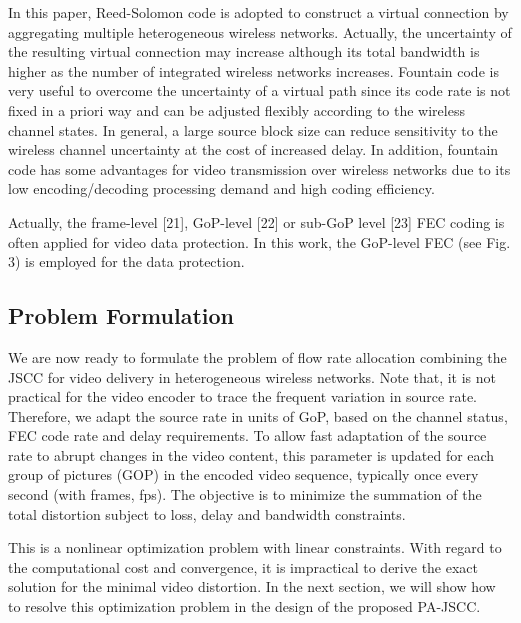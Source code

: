 \documentclass[journal]{IEEEtran}
\begin{document}
In this paper, Reed-Solomon code is adopted to construct a virtual connection by aggregating multiple heterogeneous wireless networks. Actually, the uncertainty of the resulting virtual connection may increase although its total bandwidth is higher as the number of integrated wireless networks increases. Fountain code is very useful to overcome the uncertainty of a virtual path since its code rate is not fixed in a priori way and can be adjusted flexibly according to the wireless channel states. In general, a large source block size can reduce sensitivity to the wireless channel uncertainty at the cost of increased delay. In addition, fountain code has some advantages for video transmission over wireless networks due to its low encoding/decoding processing demand and high coding efficiency.

Actually, the frame-level [21], GoP-level [22] or sub-GoP level [23] FEC coding is often applied for video data protection. In this work, the GoP-level FEC (see Fig. 3) is employed for the data protection.


\subsection{Problem Formulation}
\vspace{-2pt}
We are now ready to formulate the problem of flow rate allocation combining the JSCC for video delivery in heterogeneous wireless networks. Note that, it is not practical for the video encoder to trace the frequent variation in source rate. Therefore, we adapt the source rate in units of GoP, based on the channel status, FEC code rate and delay requirements. To allow fast adaptation of the source rate to abrupt changes in the video content, this parameter is updated for each group of pictures (GOP) in the encoded video sequence, typically once every  second (with  frames,  fps). The objective is to minimize the summation of the total distortion  subject to loss, delay and bandwidth constraints.


This is a nonlinear optimization problem with linear constraints. With regard to the computational cost and convergence, it is impractical to derive the exact solution for the minimal video distortion. In the next section, we will show how to resolve this optimization problem in the design of the proposed PA-JSCC.
\end{document}
